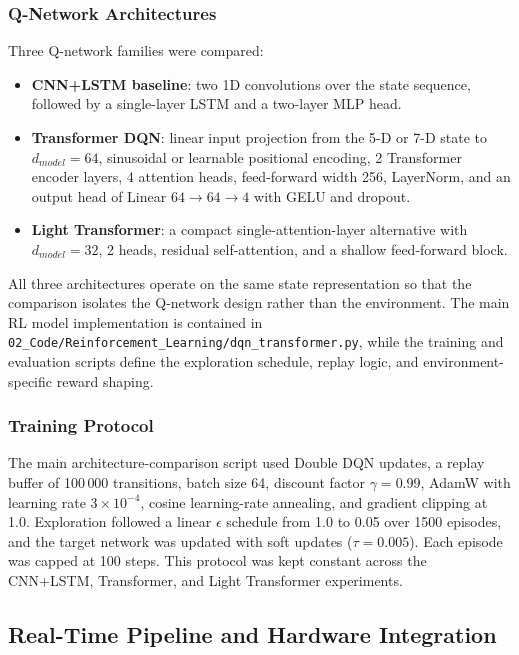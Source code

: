 \documentclass[12pt, a4paper]{article}
\begin{document}
\subsubsection{Q-Network Architectures}

Three Q-network families were compared:
\begin{itemize}
    \item \textbf{CNN+LSTM baseline}: two 1D convolutions over the state sequence, followed by a single-layer LSTM and a two-layer MLP head.
    \item \textbf{Transformer DQN}: linear input projection from the 5-D or 7-D state to $d_{model}=64$, sinusoidal or learnable positional encoding, 2 Transformer encoder layers, 4 attention heads, feed-forward width 256, LayerNorm, and an output head of Linear $64 \rightarrow 64 \rightarrow 4$ with GELU and dropout.
    \item \textbf{Light Transformer}: a compact single-attention-layer alternative with $d_{model}=32$, 2 heads, residual self-attention, and a shallow feed-forward block.
\end{itemize}
All three architectures operate on the same state representation so that the comparison isolates the Q-network design rather than the environment. The main RL model implementation is contained in \texttt{02\_Code/Reinforcement\_Learning/dqn\_transformer.py}, while the training and evaluation scripts define the exploration schedule, replay logic, and environment-specific reward shaping.

\subsubsection{Training Protocol}

The main architecture-comparison script used Double DQN updates, a replay buffer of 100\,000 transitions, batch size 64, discount factor $\gamma = 0.99$, AdamW with learning rate $3 \times 10^{-4}$, cosine learning-rate annealing, and gradient clipping at 1.0. Exploration followed a linear $\epsilon$ schedule from 1.0 to 0.05 over 1500 episodes, and the target network was updated with soft updates ($\tau = 0.005$). Each episode was capped at 100 steps. This protocol was kept constant across the CNN+LSTM, Transformer, and Light Transformer experiments.

\subsection{Real-Time Pipeline and Hardware Integration}
\end{document}

